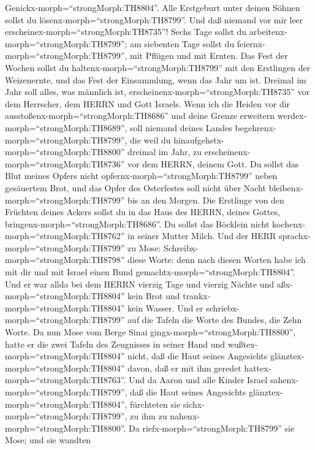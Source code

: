 Genickx-morph=``strongMorph:TH8804''. Alle Erstgeburt unter deinen
Söhnen sollst du lösenx-morph=``strongMorph:TH8799''. Und daß niemand
vor mir leer erscheinex-morph=``strongMorph:TH8735''! 
Sechs Tage sollst du arbeitenx-morph=``strongMorph:TH8799''; am
siebenten Tage sollst du feiernx-morph=``strongMorph:TH8799'', mit
Pflügen und mit Ernten.  Das Fest der Wochen sollst du
haltenx-morph=``strongMorph:TH8799'' mit den Erstlingen der Weizenernte,
und das Fest der Einsammlung, wenn das Jahr um ist. 
Dreimal im Jahr soll alles, was männlich ist,
erscheinenx-morph=``strongMorph:TH8735'' vor dem Herrscher, dem HERRN
und Gott Israels.  Wenn ich die Heiden vor dir
ausstoßenx-morph=``strongMorph:TH8686'' und deine Grenze erweitern
werdex-morph=``strongMorph:TH8689'', soll niemand deines Landes
begehrenx-morph=``strongMorph:TH8799'', die weil du
hinaufgehstx-morph=``strongMorph:TH8800'' dreimal im Jahr, zu
erscheinenx-morph=``strongMorph:TH8736'' vor dem HERRN, deinem Gott.
 Du sollst das Blut meines Opfers nicht
opfernx-morph=``strongMorph:TH8799'' neben gesäuertem Brot, und das
Opfer des Osterfestes soll nicht über Nacht
bleibenx-morph=``strongMorph:TH8799'' bis an den Morgen. 
Die Erstlinge von den Früchten deines Ackers sollst du in das Haus des
HERRN, deines Gottes, bringenx-morph=``strongMorph:TH8686''. Du sollst
das Böcklein nicht kochenx-morph=``strongMorph:TH8762'' in seiner Mutter
Milch.  Und der HERR sprachx-morph=``strongMorph:TH8799''
zu Mose: Schreibx-morph=``strongMorph:TH8798'' diese Worte: denn nach
diesen Worten habe ich mit dir und mit Israel einen Bund
gemachtx-morph=``strongMorph:TH8804''.  Und er war allda
bei dem HERRN vierzig Tage und vierzig Nächte und
aßx-morph=``strongMorph:TH8804'' kein Brot und
trankx-morph=``strongMorph:TH8804'' kein Wasser. Und er
schriebx-morph=``strongMorph:TH8799'' auf die Tafeln die Worte des
Bundes, die Zehn Worte.  Da nun Mose vom Berge Sinai
gingx-morph=``strongMorph:TH8800'', hatte er die zwei Tafeln des
Zeugnisses in seiner Hand und wußtex-morph=``strongMorph:TH8804'' nicht,
daß die Haut seines Angesichts glänztex-morph=``strongMorph:TH8804''
davon, daß er mit ihm geredet hattex-morph=``strongMorph:TH8763''.
 Und da Aaron und alle Kinder Israel
sahenx-morph=``strongMorph:TH8799'', daß die Haut seines Angesichts
glänztex-morph=``strongMorph:TH8804'', fürchteten sie
sichx-morph=``strongMorph:TH8799'', zu ihm zu
nahenx-morph=``strongMorph:TH8800''.  Da
riefx-morph=``strongMorph:TH8799'' sie Mose; und sie wandten

